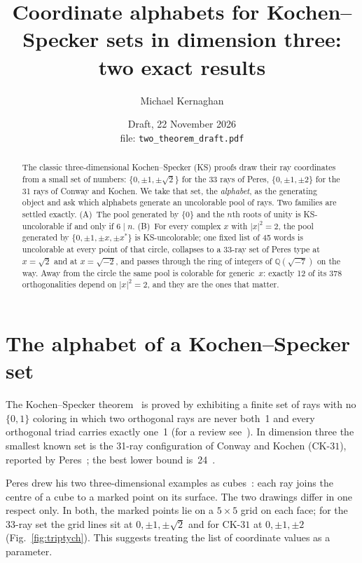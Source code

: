 \documentclass[11pt,a4paper]{article}
\title{Coordinate alphabets for Kochen--Specker sets in dimension three:\\
two exact results}
\author{Michael Kernaghan}
\date{Draft, 22 November 2026\\[2pt]{\small file: \texttt{two\_theorem\_draft.pdf}}}
\theoremstyle{remark}
\newcommand{\Q}{\mathbb{Q}}
\newcommand{\CK}{\mathrm{CK}\text{-}31}
\begin{document}
\maketitle
\thispagestyle{fancy}

\begin{abstract}
The classic three-dimensional Kochen--Specker (KS) proofs draw their ray coordinates from a small
set of numbers: $\{0,\pm1,\pm\sqrt2\}$ for the 33 rays of Peres, $\{0,\pm1,\pm2\}$ for the 31 rays
of Conway and Kochen.  We take that set, the \emph{alphabet}, as the generating object and ask
which alphabets generate an uncolorable pool of rays.  Two families are settled exactly.
(A)~The pool generated by $\{0\}$ and the $n$th roots of unity is KS-uncolorable if and only if
$6\mid n$.  (B)~For every complex $x$ with $|x|^2=2$, the pool generated by
$\{0,\pm1,\pm x,\pm x^{*}\}$ is KS-uncolorable; one fixed list of 45 words is uncolorable at every
point of that circle, collapses to a 33-ray set of Peres type at $x=\sqrt2$ and at $x=\sqrt{-2}$,
and passes through the ring of integers of $\Q(\sqrt{-7})$ on the way.  Away from the circle the
same pool is colorable for generic~$x$: exactly 12 of its 378 orthogonalities depend on
$|x|^2=2$, and they are the ones that matter.
\end{abstract}

\section{The alphabet of a Kochen--Specker set}

The Kochen--Specker theorem~\cite{KochenSpecker1967} is proved by exhibiting a finite set of rays
with no $\{0,1\}$ coloring in which two orthogonal rays are never both~1 and every orthogonal
triad carries exactly one~1 (for a review see~\cite{Budroni2022}).  In dimension three the
smallest known set is the 31-ray configuration of Conway and Kochen ($\CK$), reported by
Peres~\cite{Peres1993}; the best lower bound is~24~\cite{LiBrightGanesh2024,KirchwegerPeitlSzeider2023}.

Peres drew his two three-dimensional examples as cubes~\cite{Peres1991,Peres1993}: each ray joins
the centre of a cube to a marked point on its surface.  The two drawings differ in one respect
only.  In both, the marked points lie on a $5\times5$ grid on each face; for the 33-ray set the
grid lines sit at $0,\pm1,\pm\sqrt2$ and for $\CK$ at $0,\pm1,\pm2$
(Fig.~\ref{fig:triptych}).  This suggests treating the list of coordinate values as a parameter.
\end{document}

